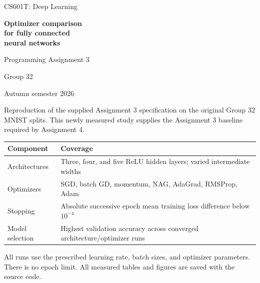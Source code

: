 \documentclass[11pt,a4paper]{article}
\begin{document}
\hypersetup{pageanchor=false}

\begin{titlepage}\thispagestyle{empty}

{\color{accent}\large CS601T: Deep Learning}\par\vspace{24mm}

{\color{ink}\Huge\bfseries Optimizer comparison\\for fully connected\\neural networks}\par\vspace{8mm}

{\LARGE Programming Assignment 3}\par\vspace{4mm}

{\Large Group 32}\par\vspace{5mm}

{\large Autumn semester 2026}\par\vspace{10mm}

Reproduction of the supplied Assignment 3 specification on the original Group 32 MNIST splits. This newly measured study supplies the Assignment 3 baseline required by Assignment 4.


\begingroup\small\setlength{\tabcolsep}{5pt}

\begin{tabularx}{\linewidth}{lY}

\toprule

\textbf{Component} & \textbf{Coverage} \\

\midrule

Architectures & Three, four, and five ReLU hidden layers; varied intermediate widths \\

Optimizers & SGD, batch GD, momentum, NAG, AdaGrad, RMSProp, Adam \\

Stopping & Absolute successive epoch mean training loss difference below $10^{-4}$ \\

Model selection & Highest validation accuracy across converged architecture/optimizer runs \\

\bottomrule\end{tabularx}\endgroup\par\medskip

All runs use the prescribed learning rate, batch sizes, and optimizer parameters. There is no epoch limit. All measured tables and figures are saved with the source code.


\vfill\end{titlepage}\hypersetup{pageanchor=true}
\end{document}
